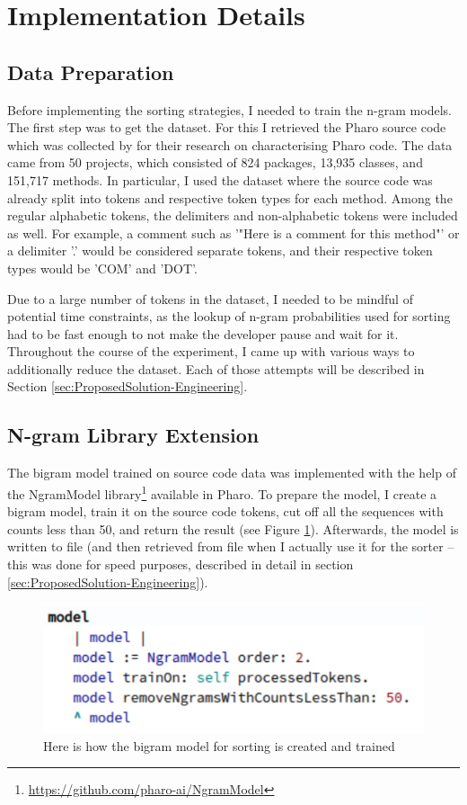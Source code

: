 \section{Implementation Details}
\label{sec:ProposedSolution-Implementation}
\subsection{Data Preparation}
Before implementing the sorting strategies, I needed to train the n-gram models. The first step was to get the dataset. For this I retrieved the Pharo source code which was collected by \cite{Zait20a} for their research on characterising Pharo code. The data came from 50 projects, which consisted of 824 packages, 13,935 classes, and 151,717 methods. In particular, I used the dataset where the source code was already split into tokens and respective token types for each method. Among the regular alphabetic tokens, the delimiters and non-alphabetic tokens were included as well. For example, a comment such as '"Here is a comment for this method"' or a delimiter '.' would be considered separate tokens, and their respective token types would be 'COM' and 'DOT'.

Due to a large number of tokens in the dataset, I needed to be mindful of potential time constraints, as the lookup of n-gram probabilities used for sorting had to be fast enough to not make the developer pause and wait for it. Throughout the course of the experiment, I came up with various ways to additionally reduce the dataset. Each of those attempts will be described in Section \ref{sec:ProposedSolution-Engineering}.

\subsection{N-gram Library Extension}
The bigram model trained on source code data was implemented with the help of the NgramModel library\footnote{\url{https://github.com/pharo-ai/NgramModel}} available in Pharo. To prepare the model, I create a bigram model, train it on the source code tokens, cut off all the sequences with counts less than 50, and return the result (see Figure \ref{fig:bigramModel}). Afterwards, the model is written to file (and then retrieved from file when I actually use it for the sorter -- this was done for speed purposes, described in detail in section \ref{sec:ProposedSolution-Engineering}).

\begin{figure}[H]
    \centering
    \includegraphics[width=0.9\linewidth]{images/bigramModel.png}
    \caption{Here is how the bigram model for sorting is created and trained}
    \label{fig:bigramModel}
\end{figure}

